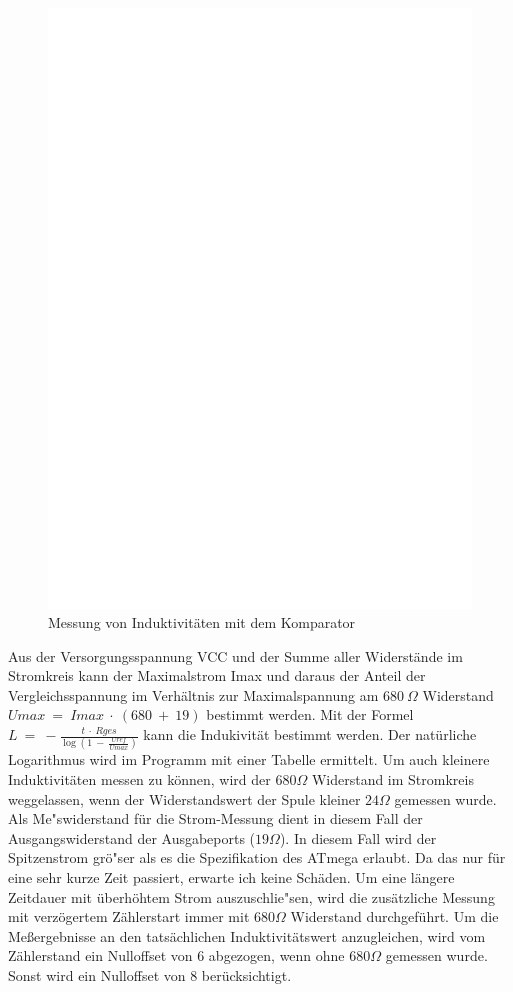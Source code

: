 \begin{figure}[H]
\centering
\includegraphics[]{../FIG/Inductance.eps}
\caption{Messung von Induktivit\"aten mit dem Komparator}
\label{fig:Inductance}
\end{figure}

Aus der Versorgungsspannung VCC und der Summe aller Widerst\"ande im Stromkreis kann der Maximalstrom Imax und
daraus der Anteil der Vergleichsspannung im Verh\"altnis zur Maximalspannung am \(680~\Omega\) Widerstand
\(Umax~=~Imax~\cdot~(680~+~19)\) bestimmt werden.
Mit der Formel \(L~=~-\frac{t~\cdot~Rges}{\log{(1~-~\frac{Uref}{Umax})}}\) kann die Indukivit\"at bestimmt werden.
Der nat\"urliche Logarithmus wird im Programm mit einer Tabelle ermittelt.
Um auch kleinere Induktivit\"aten messen zu k\"onnen, wird der \(680 \Omega\) Widerstand im Stromkreis weggelassen,
wenn der Widerstandswert der Spule kleiner \(24 \Omega\) gemessen wurde. Als Me"swiderstand f\"ur die Strom-Messung
dient in diesem Fall der Ausgangswiderstand der Ausgabeports (\(19 \Omega\)). In diesem Fall wird der Spitzenstrom gr\"o"ser
als es die Spezifikation des ATmega erlaubt. Da das nur f\"ur eine sehr kurze Zeit passiert, erwarte ich keine Sch\"aden.
Um eine l\"angere Zeitdauer mit \"uberh\"ohtem Strom auszuschlie"sen, wird die zus\"atzliche Messung mit 
verz\"ogertem Z\"ahlerstart immer mit \(680 \Omega\) Widerstand durchgef\"uhrt.
Um die Meßergebnisse an den tats\"achlichen Induktivit\"atswert anzugleichen, wird vom Z\"ahlerstand ein
Nulloffset von 6 abgezogen, wenn ohne \(680 \Omega\) gemessen wurde. Sonst wird ein Nulloffset von 8 ber\"ucksichtigt.


